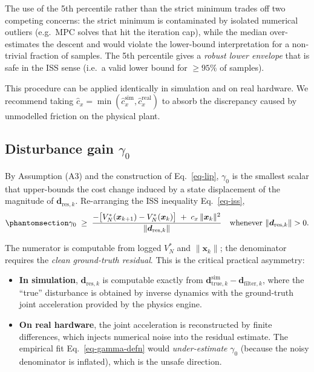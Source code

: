\documentclass[
  11pt,
]{article}
\providecommand{\tightlist}{%
  \setlength{\itemsep}{0pt}\setlength{\parskip}{0pt}}
\theoremstyle{plain}
\theoremstyle{plain}
\theoremstyle{definition}
\theoremstyle{remark}
\begin{document}
The use of the 5th percentile rather than the strict minimum trades off
two competing concerns: the strict minimum is contaminated by isolated
numerical outliers (e.g.~MPC solves that hit the iteration cap), while
the median over-estimates the descent and would violate the lower-bound
interpretation for a non-trivial fraction of samples. The 5th percentile
gives a \emph{robust lower envelope} that is safe in the ISS sense
(i.e.~a valid lower bound for \(\ge 95\%\) of samples).

This procedure can be applied identically in simulation and on real
hardware. We recommend taking
\(\hat{c}_x = \min(\hat{c}_x^{\mathrm{sim}},\hat{c}_x^{\mathrm{real}})\)
to absorb the discrepancy caused by unmodelled friction on the physical
plant.

\subsection{\texorpdfstring{Disturbance gain
\(\gamma_0\)}{Disturbance gain \textbackslash gamma\_0}}\label{sec-estim-gamma}

By Assumption (A3) and the construction of Eq.~\ref{eq-lip},
\(\gamma_0\) is the smallest scalar that upper-bounds the cost change
induced by a state displacement of the magnitude of
\(\bm{d}_{\mathrm{res},k}\). Re-arranging the ISS inequality
Eq.~\ref{eq-iss},
\begin{equation}\protect\phantomsection\label{eq-gamma-defn}{
\gamma_0 \;\ge\;
\frac{-\bigl[V_N^*(\bm{x}_{k+1}) - V_N^*(\bm{x}_k)\bigr]
       \;+\; c_x\,\|\bm{x}_k\|^2}
     {\|\bm{d}_{\mathrm{res},k}\|}
\quad\text{whenever } \|\bm{d}_{\mathrm{res},k}\| > 0.
}\end{equation}

The numerator is computable from logged \(V_N^*\) and \(\|\bm{x}_k\|\);
the denominator requires the \emph{clean ground-truth residual}. This is
the critical practical asymmetry:

\begin{itemize}
\tightlist
\item
  \textbf{In simulation}, \(\bm{d}_{\mathrm{res},k}\) is computable
  exactly from \(\bm{d}_{\mathrm{true},k}^{\mathrm{sim}} -
  \bm{d}_{\mathrm{filter},k}\), where the ``true'' disturbance is
  obtained by inverse dynamics with the ground-truth joint acceleration
  provided by the physics engine.
\item
  \textbf{On real hardware}, the joint acceleration is reconstructed by
  finite differences, which injects numerical noise into the residual
  estimate. The empirical fit Eq.~\ref{eq-gamma-defn} would
  \emph{under-estimate} \(\gamma_0\) (because the noisy denominator is
  inflated), which is the unsafe direction.
\end{itemize}
\end{document}
